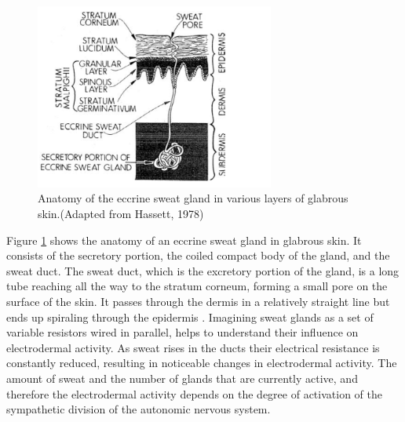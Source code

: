 \begin{figure}[ht]
\centering
\includegraphics[width=0.7\textwidth]{images/skinAnatomy.png}
\caption{Anatomy of the eccrine sweat gland in various layers of glabrous skin.(Adapted from Hassett, 1978)\citep{HANDBOOKPP}}
\label{layerImg}
\end{figure}

Figure \ref{layerImg} shows the anatomy of an eccrine sweat gland in glabrous skin. It consists of the  secretory portion, the coiled compact body of the gland, and the sweat duct. The sweat duct, which is the excretory portion of the gland, is a long tube reaching all the way to the stratum corneum, forming a small pore on the surface of the skin. It passes through the dermis in a relatively straight line but ends up spiraling through the epidermis \cite{HANDBOOKPP}. Imagining sweat glands as a set of variable resistors wired in parallel, helps to understand their influence on electrodermal activity. As sweat rises in the ducts their electrical resistance is constantly reduced, resulting in noticeable changes in electrodermal activity. The amount of sweat and the number of glands that are currently active, and therefore the electrodermal activity depends on the degree of activation of the sympathetic division of the autonomic nervous system.


